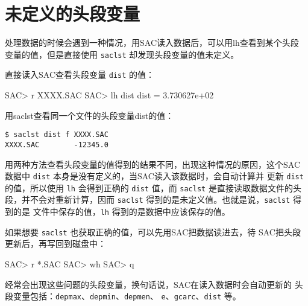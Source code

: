 \section{未定义的头段变量}
处理数据的时候会遇到一种情况，用SAC读入数据后，可以用lh查看到某个头段
变量的值，但是直接使用 \texttt{saclst} 却发现头段变量的值未定义。

直接读入SAC查看头段变量 \texttt{dist} 的值：
\begin{SACCode}
SAC> r XXXX.SAC
SAC> lh dist
     dist = 3.730627e+02
\end{SACCode}

用saclst查看同一个文件的头段变量dist的值：
\begin{verbatim}
$ saclst dist f XXXX.SAC
XXXX.SAC        -12345.0
\end{verbatim}

用两种方法查看头段变量的值得到的结果不同，出现这种情况的原因，这个SAC
数据中 \texttt{dist} 本身是没有定义的，当SAC读入该数据时，会自动计算并
更新 \texttt{dist} 的值，所以使用 \texttt{lh} 会得到正确的 \texttt{dist}
值，而 \texttt{saclst} 是直接读取数据文件的头段，并不会对重新计算，因而
\texttt{saclst} 得到的是未定义值。也就是说，\texttt{saclst} 得到的是
文件中保存的值，\texttt{lh} 得到的是数据中应该保存的值。

如果想要 \texttt{saclst} 也获取正确的值，可以先用SAC把数据读进去，待
SAC把头段更新后，再写回到磁盘中：
\begin{SACCode}
SAC> r *.SAC
SAC> wh
SAC> q
\end{SACCode}

经常会出现这些问题的头段变量，换句话说，SAC在读入数据时会自动更新的
头段变量包括：\texttt{depmax}、\texttt{depmin}、\texttt{depmen}、
\texttt{e}、\texttt{gcarc}、\texttt{dist} 等。
